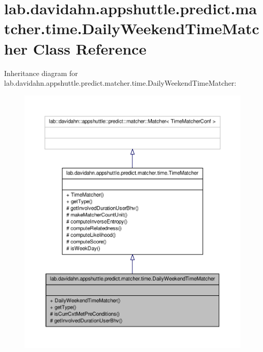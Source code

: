 \hypertarget{classlab_1_1davidahn_1_1appshuttle_1_1predict_1_1matcher_1_1time_1_1_daily_weekend_time_matcher}{\section{lab.\-davidahn.\-appshuttle.\-predict.\-matcher.\-time.\-Daily\-Weekend\-Time\-Matcher \-Class \-Reference}
\label{classlab_1_1davidahn_1_1appshuttle_1_1predict_1_1matcher_1_1time_1_1_daily_weekend_time_matcher}
}


\-Inheritance diagram for lab.\-davidahn.\-appshuttle.\-predict.\-matcher.\-time.\-Daily\-Weekend\-Time\-Matcher\-:
\nopagebreak
\begin{figure}[H]
\begin{center}
\leavevmode
\includegraphics[width=350pt]{classlab_1_1davidahn_1_1appshuttle_1_1predict_1_1matcher_1_1time_1_1_daily_weekend_time_matcher__inherit__graph}
\end{center}
\end{figure}


